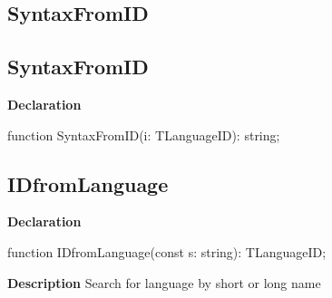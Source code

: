 \documentclass{report}
\newif\ifpdf
\begin{document}
\subsection*{\large{\textbf{SyntaxFromID}}\normalsize\hspace{1ex}\hrulefill}
\else
\subsection*{SyntaxFromID}
\fi
\label{PasDoc_Languages-SyntaxFromID}
\begin{list}{}{
\setlength{\itemindent}{0cm}
\setlength{\listparindent}{0cm}
\setlength{\leftmargin}{\evensidemargin}
\addtolength{\leftmargin}{\tmplength}
\settowidth{\labelsep}{X}
\addtolength{\leftmargin}{\labelsep}
\setlength{\labelwidth}{\tmplength}
}
\item[\textbf{Declaration}\hfill]
\ifpdf
\begin{flushleft}
\fi
\begin{ttfamily}
function SyntaxFromID(i: TLanguageID): string;\end{ttfamily}

\ifpdf
\end{flushleft}
\fi

\end{list}
\ifpdf
\subsection*{\large{\textbf{IDfromLanguage}}\normalsize\hspace{1ex}\hrulefill}
\else
\subsection*{IDfromLanguage}
\fi
\label{PasDoc_Languages-IDfromLanguage}
\begin{list}{}{
\setlength{\itemindent}{0cm}
\setlength{\listparindent}{0cm}
\setlength{\leftmargin}{\evensidemargin}
\addtolength{\leftmargin}{\tmplength}
\settowidth{\labelsep}{X}
\addtolength{\leftmargin}{\labelsep}
\setlength{\labelwidth}{\tmplength}
}
\item[\textbf{Declaration}\hfill]
\ifpdf
\begin{flushleft}
\fi
\begin{ttfamily}
function IDfromLanguage(const s: string): TLanguageID;\end{ttfamily}

\ifpdf
\end{flushleft}
\fi

\par
\item[\textbf{Description}]
Search for language by short or long name

\end{list}
\ifpdf
\end{document}
